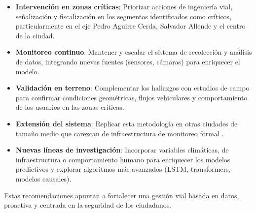\documentclass[12pt]{article}
\begin{document}
\begin{itemize}
    \item \textbf{Intervención en zonas críticas}: Priorizar acciones de ingeniería vial, señalización y fiscalización en los segmentos identificados como críticos, particularmente en el eje Pedro Aguirre Cerda, Salvador Allende y el centro de la ciudad.
    \item \textbf{Monitoreo continuo}: Mantener y escalar el sistema de recolección y análisis de datos, integrando nuevas fuentes (sensores, cámaras) para enriquecer el modelo.
    \item \textbf{Validación en terreno}: Complementar los hallazgos con estudios de campo para confirmar condiciones geométricas, flujos vehiculares y comportamiento de los usuarios en las zonas críticas.
    \item \textbf{Extensión del sistema}: Replicar esta metodología en otras ciudades de tamaño medio que carezcan de infraestructura de monitoreo formal \citep{berhanu2024}.
    \item \textbf{Nuevas líneas de investigación}: Incorporar variables climáticas, de infraestructura o comportamiento humano para enriquecer los modelos predictivos y explorar algoritmos más avanzados (LSTM, transformers, modelos causales).
\end{itemize}

Estas recomendaciones apuntan a fortalecer una gestión vial basada en datos, proactiva y centrada en la seguridad de los ciudadanos.

\newpage


\end{document}
